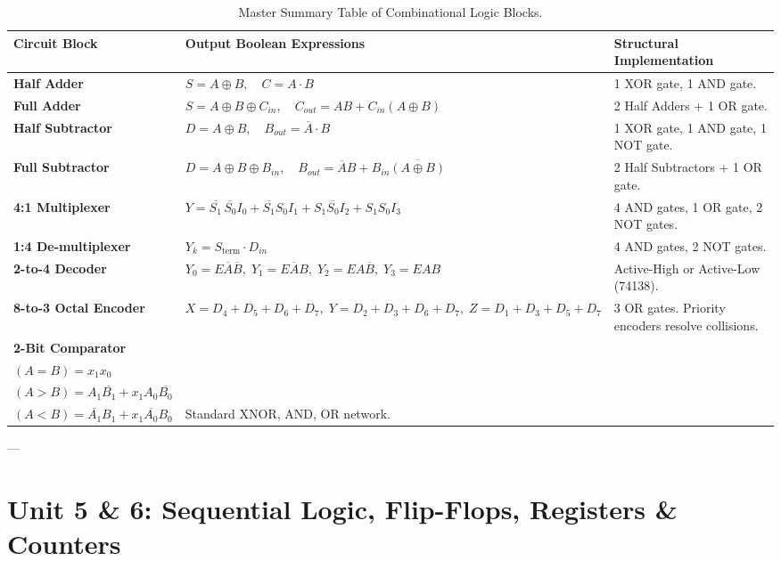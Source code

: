 \begin{table}[htbp]
\centering
\small
\begin{tabularx}{\textwidth}{lXX}
\toprule
\textbf{Circuit Block} & \textbf{Output Boolean Expressions} & \textbf{Structural Implementation} \\
\midrule
\textbf{Half Adder} & $S = A \oplus B, \quad C = A \cdot B$ & 1 XOR gate, 1 AND gate. \\
\textbf{Full Adder} & $S = A \oplus B \oplus C_{in}, \quad C_{out} = AB + C_{in}(A \oplus B)$ & 2 Half Adders + 1 OR gate. \\
\textbf{Half Subtractor} & $D = A \oplus B, \quad B_{out} = \overline{A} \cdot B$ & 1 XOR gate, 1 AND gate, 1 NOT gate. \\
\textbf{Full Subtractor} & $D = A \oplus B \oplus B_{in}, \quad B_{out} = \overline{A}B + B_{in}\overline{(A \oplus B)}$ & 2 Half Subtractors + 1 OR gate. \\
\textbf{4:1 Multiplexer} & $Y = \overline{S_1}\,\overline{S_0}I_0 + \overline{S_1}S_0I_1 + S_1\overline{S_0}I_2 + S_1S_0I_3$ & 4 AND gates, 1 OR gate, 2 NOT gates. \\
\textbf{1:4 De-multiplexer} & $Y_k = S_{\text{term}} \cdot D_{in}$ & 4 AND gates, 2 NOT gates. \\
\textbf{2-to-4 Decoder} & $Y_0 = E\overline{A}\overline{B}, \; Y_1 = E\overline{A}B, \; Y_2 = EA\overline{B}, \; Y_3 = EAB$ & Active-High or Active-Low (74138). \\
\textbf{8-to-3 Octal Encoder} & $X = D_4+D_5+D_6+D_7, \; Y = D_2+D_3+D_6+D_7, \; Z = D_1+D_3+D_5+D_7$ & 3 OR gates. Priority encoders resolve collisions. \\
\textbf{2-Bit Comparator} & \makecell[l]{$x_1 = \overline{A_1 \oplus B_1}, \; x_0 = \overline{A_0 \oplus B_0}$\\$(A = B) = x_1 x_0$\\$(A > B) = A_1\overline{B_1} + x_1 A_0\overline{B_0}$\\$(A < B) = \overline{A_1}B_1 + x_1 \overline{A_0}B_0$} & Standard XNOR, AND, OR network. \\
\bottomrule
\end{tabularx}
\caption{Master Summary Table of Combinational Logic Blocks.}
\label{tab:rev-unit4}
\end{table}

---

\section{Unit 5 \& 6: Sequential Logic, Flip-Flops, Registers \& Counters}

